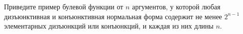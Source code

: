 Приведите пример булевой функции от $n$ аргументов, у которой любая дизъюнктивная и конъюнктивная
нормальная форма содержит не менее $2^{n - 1}$ элементарных дизъюнкций или конъюнкций, и каждая из них
длины $n$.